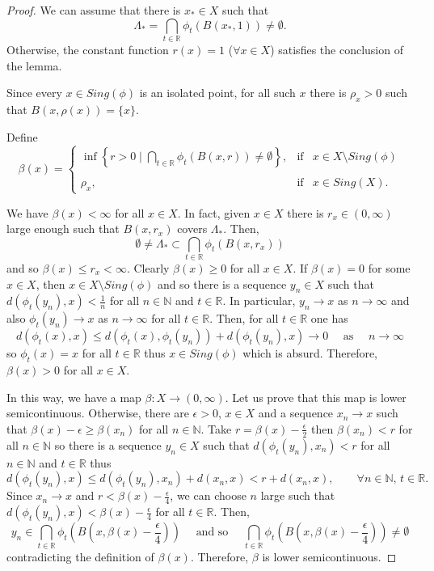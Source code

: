 \documentclass[11pt,letterpaper]{amsart}
\begin{document}
\begin{proof}
We can assume that there is $x_*\in X$ such that
$$
\Lambda_*=\bigcap_{t\in\mathbb{R}}\phi_t(B(x_*,1))\neq\emptyset.
$$
Otherwise, the constant function $r(x)=1$ ($\forall x\in X$) satisfies the conclusion of the lemma.

Since every $x\in Sing(\phi)$ is an isolated point,
for all such $x$ there is $\rho_x>0$ such that
$B(x,\rho(x))=\{x\}$.

Define
$$
\beta(x) = \left\{
\begin{array}{rcl}
\inf\left\{r>0\mid \displaystyle\bigcap_{t\in\mathbb{R}}\phi_t(B(x,r))\neq\emptyset\right\}, & \mbox{if} & x\in X\setminus Sing(\phi)\\
& & \\
\rho_x,& \mbox{if} & x\in Sing(X).
\end{array}
\right.
$$

We have $\beta(x)<\infty$ for all $x\in X$. In fact,
given $x\in X$ there is $r_x\in (0,\infty)$ large enough such that $B(x,r_x)$ covers $\Lambda_*$.
Then,
$$
\emptyset\neq\Lambda_*\subset \bigcap_{t\in\mathbb{R}}\phi_t(B(x,r_x))
$$
and so $\beta(x)\leq r_x<\infty$.
Clearly $ \beta(x)\geq0$ for all $x\in X$.
If $\beta(x)=0$ for some $x\in X$, then $x\in X\setminus Sing(\phi)$ and so
there is a sequence $y_n\in X$ such that
$d(\phi_t(y_n),x)<\frac{1}n$ for all $n\in\mathbb{N}$ and $t\in\mathbb{R}$.
In particular, $y_n\to x$ as $n\to\infty$ and also $\phi_t(y_n)\to x$ as $n\to\infty$ for all $t\in \mathbb{R}$.
Then, for all $t\in\mathbb{R}$ one has
$$
d(\phi_t(x),x)\leq d(\phi_t(x),\phi_t(y_n))+d(\phi_t(y_n),x)\to0\quad\mbox{ as }\quad n\to\infty
$$
so $\phi_t(x)=x$ for all $t\in\mathbb{R}$ thus $x\in Sing(\phi)$ which is absurd.
Therefore, $\beta(x)>0$ for all $x\in X$.

In this way, we have a map $\beta:X\to(0,\infty)$.
Let us prove that this map is lower semicontinuous.
Otherwise, there are $\epsilon>0$, $x\in X$ and a sequence $x_n\to x$ such that
$\beta(x)-\epsilon\geq \beta(x_n)$ for all $n\in\mathbb{N}$.
Take $r=\beta(x)-\frac{\epsilon}2$ then $\beta(x_n)<r$ for all $n\in\mathbb{N}$ so
there is a sequence $y_n\in X$ such that $d(\phi_t(y_n),x_n)<r$
for all $n\in\mathbb{N}$ and $t\in\mathbb{R}$
thus
$$
d(\phi_t(y_n),x)\leq d(\phi_t(y_n),x_n)+d(x_n,x)<r+d(x_n,x),\quad\quad\forall n\in\mathbb{N}, \, t\in\mathbb{R}.
$$
Since $x_n\to x$ and $r<\beta(x)-\frac{\epsilon}4$, we can choose $n$ large such that
$d(\phi_t(y_n),x)<\beta(x)-\frac{\epsilon}4$ for all $t\in\mathbb{R}$.
Then,
$$
y_n\in \bigcap_{t\in\mathbb{R}}\phi_t(B(x,\beta(x)-\frac{\epsilon}4))
\quad\mbox{ and so }\quad
\bigcap_{t\in\mathbb{R}}\phi_t(B(x,\beta(x)-\frac{\epsilon}4))\neq\emptyset
$$
contradicting the definition of $\beta(x)$. Therefore, $\beta$ is lower semicontinuous.


\end{proof}
\end{document}
